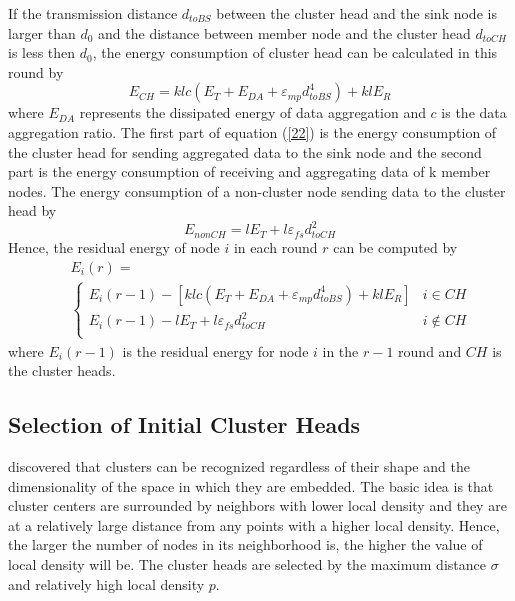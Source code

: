 \documentclass[journal,twoside,web]{ieeecolor}
\begin{document}
If the transmission distance $d_{toBS}$ between the cluster head and the sink node is larger than $d_0$ and the distance between member node and the cluster head $d_{toCH}$ is less then $d_0$, the energy consumption of cluster head can be calculated in this round by
\begin{equation}
\label{22}
E_{CH} = klc\left(E_{T} + E_{DA} + \varepsilon_{mp}d^4_{toBS}\right) + klE_R
\end{equation}
where $E_{DA}$ represents the dissipated energy of data aggregation and $c$ is the data aggregation ratio. The first part of equation (\ref{22}) is the energy consumption of the cluster head for sending aggregated data to the sink node and the second part is the energy consumption of receiving and aggregating data of k member nodes. The energy consumption of a non-cluster node sending data to the cluster head by
\begin{equation}
E_{nonCH} = lE_T + l\varepsilon_{fs}d^2_{toCH}
\end{equation}
Hence, the residual energy of node $i$ in each round $r$ can be computed by
\begin{eqnarray}
\label{24}
&&  E_i\left(r\right)=\\
&&  \left\{ \begin{array}{ll}
E_i\left(r-1\right) - [ klc\left(E_{T} + E_{DA} + \varepsilon_{mp} d^4_{toBS}\right) + klE_R]& i \in CH \\
E_i\left(r-1\right) - lE_T + l\varepsilon_{fs}d^2_{toCH} & i \notin CH \\
\end{array} \right.
\end{eqnarray}
where $E_i\left(r-1\right)$ is the residual energy for node $i$ in the $r-1$ round and $CH$ is the cluster heads.

\subsection{Selection of Initial Cluster Heads}
\cite{b18} discovered that clusters can be recognized regardless of their shape and the dimensionality of the space in which they are embedded. The basic idea is that cluster centers are surrounded by neighbors with lower local density and they are at a relatively large distance from any points with a higher local density. Hence, the larger the number of nodes in its neighborhood is, the higher the value of local density will be. The cluster heads are selected by the maximum distance $\sigma$ and relatively high local density $p$.
\end{document}
